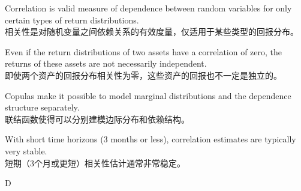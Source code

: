 \documentclass{article}
\begin{document}
\begin{choices}
    \item Correlation is valid measure of dependence between random variables for only certain types of return distributions.\\
        相关性是对随机变量之间依赖关系的有效度量，仅适用于某些类型的回报分布。
    \item Even if the return distributions of two assets have a correlation of zero, the returns of these assets are not necessarily independent.\\
        即使两个资产的回报分布相关性为零，这些资产的回报也不一定是独立的。
    \item Copulas make it possible to model marginal distributions and the dependence structure separately.\\
        联结函数使得可以分别建模边际分布和依赖结构。
    \item With short time horizons (3 months or less), correlation estimates are typically very stable.\\
        短期（3个月或更短）相关性估计通常非常稳定。
\end{choices}

\begin{correctanswer}
    D
\end{correctanswer}
\end{document}

